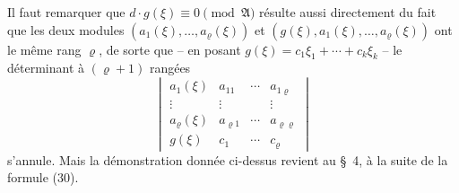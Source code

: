 \documentclass[11pt]{article}
\providecommand{\Amod}{\mathfrak A}
\providecommand{\zero}[1]{\equiv 0\pmod{#1}}
\begin{document}
Il faut remarquer que $d\cdot g(\xi)\zero{\Amod}$ résulte aussi directement du fait que les deux modules $(a_1(\xi),\ldots,a_\varrho(\xi))$ et $(g(\xi),a_1(\xi),\ldots,a_\varrho(\xi))$ ont le même rang $\varrho$, de sorte que -- en posant $g(\xi)=c_1\xi_1+\cdots+c_k\xi_k$ -- le déterminant à $(\varrho+1)$ rangées
\[
\begin{vmatrix}
 a_1(\xi)&a_{11}&\cdots&a_{1\varrho}\\
 \vdots&\vdots&&\vdots\\
 a_\varrho(\xi)&a_{\varrho1}&\cdots&a_{\varrho\varrho}\\
 g(\xi)&c_1&\cdots&c_\varrho
\end{vmatrix}
\]
s'annule. Mais la démonstration donnée ci-dessus revient au \S{}~4, à la suite de la formule (30).

\clearpage
\ifdefined\NoetherPaperTwentyTwoSOneBodyOnly
\else
\end{document}
